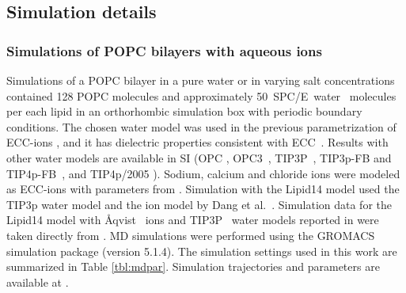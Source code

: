 \documentclass[aip,jcp,twocolumn]{revtex4}
\begin{document}
\subsection{Simulation details}

\subsubsection{Simulations of POPC bilayers with aqueous ions}
Simulations of a POPC bilayer in a pure water or in varying salt concentrations
contained 128 POPC molecules and approximately 50~SPC/E~water~\cite{Berendsen1987} molecules per each lipid
in an orthorhombic simulation box with periodic boundary conditions. 
The chosen water model was used in the previous parametrization of 
ECC-ions \cite{jungwirth17-new-paper-to-be-published, kohagen16, Pluharova2014},
and it has dielectric properties consistent with ECC~\cite{leontyev11, leontyev14}.
Results with other water models are available in SI
(OPC \cite{Izadi14}, OPC3~\cite{Izadi16}, 
TIP3P~\cite{jorgensen83},
TIP3p-FB and TIP4p-FB~\cite{Wang2014},
and TIP4p/2005 \cite{Abascal2005}).
Sodium, calcium and chloride ions 
were modeled as ECC-ions with parameters from .  %
Simulation with the Lipid14 model used the TIP3p water model \cite{jorgensen83} and the ion model by
Dang et al.~\cite{smith94,chang1999,dang2006}.
Simulation data for the Lipid14 model with \AA{}qvist~\cite{aqvist90} ions and TIP3P~\cite{jorgensen83}
water models reported in \cite{catte16} 
were taken directly from \cite{lipid14POPC0mMNaClfiles,lipid14POPC350mMCaClfiles,lipid14POPC350mMCaClfilesNC,lipid14POPC1000mMNaClfiles}. 
MD simulations were performed using the GROMACS \cite{Abraham15} simulation package (version 5.1.4).  
The simulation settings used in this work are 
summarized in Table \ref{tbl:mdpar}. 
Simulation trajectories and parameters are available at \cite{??} . 
\end{document}
